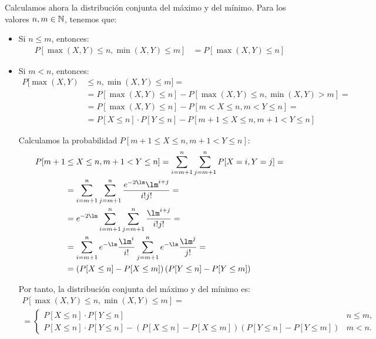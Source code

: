 \begin{ejercicio}
    Calculamos ahora la distribución conjunta del máximo y del mínimo. Para los valores $n,m\in\mathbb{N}$, tenemos que:
    \begin{itemize}
        \item Si $n\leq m$, entonces:
        \begin{align*}
            P[\max(X,Y)\leq n,\min(X,Y)\leq m]&=P[\max(X,Y)\leq n]
        \end{align*}

        \item Si $m<n$, entonces:
        \begin{align*}
            P[\max(X,Y)&\leq n,\min(X,Y)\leq m]
            =\\&= P[\max(X,Y)\leq n]-P[\max(X,Y)\leq n,\min(X,Y)> m]
            =\\&= P[\max(X,Y)\leq n]-P[m<X\leq n,m<Y\leq n]
            =\\&= P[X\leq n]\cdot P[Y\leq n]-P[m+1\leq X\leq n,m+1<Y\leq n]
        \end{align*}

        Calculamos la probabilidad $P[m+1\leq X\leq n,m+1<Y\leq n]$:
        \begin{align*}
            P[m+1&\leq X\leq n,m+1<Y\leq n]=\sum_{i=m+1}^{n}\sum_{j=m+1}^{n}P[X=i,Y=j]
            =\\&= \sum_{i=m+1}^{n}\sum_{j=m+1}^{n}\dfrac{e^{-2\lm}\lm^{i+j}}{i!j!}
            =\\&= e^{-2\lm}\sum_{i=m+1}^{n}\sum_{j=m+1}^{n}\dfrac{\lm^{i+j}}{i!j!}
            =\\&= \sum_{i=m+1}^{n}e^{-\lm}\dfrac{\lm^i}{i!}\sum_{j=m+1}^{n}e^{-\lm}\dfrac{\lm^j}{j!}
            =\\&= \left(P[X\leq n]-P[X\leq m]\right)\left(P[Y\leq n]-P[Y\leq m]\right)
        \end{align*}

        Por tanto, la distribución conjunta del máximo y del mínimo es:
        \begin{multline*}
            P[\max(X,Y)\leq n,\min(X,Y)\leq m] =\\= \begin{cases}
                P[X\leq n]\cdot P[Y\leq n] & n\leq m, \\
                P[X\leq n]\cdot P[Y\leq n]-\left(P[X\leq n]-P[X\leq m]\right)\left(P[Y\leq n]-P[Y\leq m]\right) & m<n.
            \end{cases}
        \end{multline*}
    \end{itemize}
\end{ejercicio}

